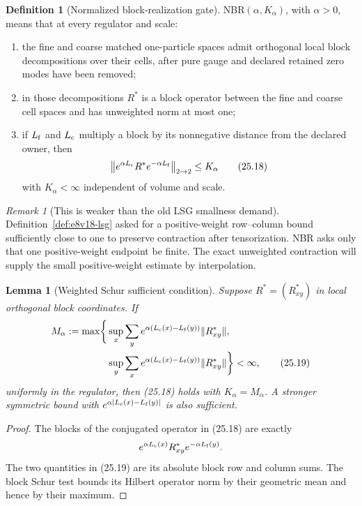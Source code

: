 \documentclass[11pt,oneside]{book}
\newtheorem{lemma}[theorem]{Lemma}
\theoremstyle{definition}
\newtheorem{definition}[theorem]{Definition}
\theoremstyle{remark}
\newtheorem{remark}[theorem]{Remark}
\begin{document}
\begin{definition}[Normalized block-realization gate]
\label{def:e8v25-NBR}
NBR\((\alpha,K_\alpha)\), with \(\alpha>0\), means that at every
regulator and scale:
\begin{enumerate}
\item the fine and coarse matched one-particle spaces admit orthogonal
local block decompositions over their cells, after pure gauge and
declared retained zero modes have been removed;
\item in those decompositions \(R^*\) is a block operator between the
fine and coarse cell spaces and has unweighted norm at most one;
\item if \(L_{\rm f}\) and \(L_{\rm c}\) multiply a block by its
nonnegative distance from the declared owner, then
\[
 \left\|
 e^{\alpha L_{\rm c}}R^*e^{-\alpha L_{\rm f}}
 \right\|_{2\to2}\leq K_\alpha                                  \tag{25.18}
\]
with \(K_\alpha<\infty\) independent of volume and scale.
\end{enumerate}
\end{definition}

\begin{remark}[This is weaker than the old LSG smallness demand]
\label{rem:e8v25-weaker}
Definition~\ref{def:e8v18-lsg} asked for a positive-weight
row--column bound sufficiently close to one to preserve contraction
after tensorization.  NBR asks only that one positive-weight endpoint
be finite.  The exact unweighted contraction will supply the small
positive-weight estimate by interpolation.
\end{remark}

\begin{lemma}[Weighted Schur sufficient condition]
\label{lem:e8v25-Schur}
Suppose \(R^*=(R^*_{xy})\) in local orthogonal block coordinates.
If
\[
\begin{split}
 M_\alpha:=\max\biggl\{&
 \sup_x\sum_y
 e^{\alpha(L_{\rm c}(x)-L_{\rm f}(y))}
       \|R^*_{xy}\|,\\
 &\sup_y\sum_x
 e^{\alpha(L_{\rm c}(x)-L_{\rm f}(y))}
       \|R^*_{xy}\|\biggr\}<\infty,                               \tag{25.19}
\end{split}
\]
uniformly in the regulator, then (25.18) holds with
\(K_\alpha=M_\alpha\).  A stronger symmetric bound with
\(e^{\alpha|L_{\rm c}(x)-L_{\rm f}(y)|}\) is also sufficient.
\end{lemma}

\begin{proof}
The blocks of the conjugated operator in (25.18) are exactly
\[
 e^{\alpha L_{\rm c}(x)}R^*_{xy}e^{-\alpha L_{\rm f}(y)}.
\]
The two quantities in (25.19) are its absolute block row and column
sums.  The block Schur test bounds its Hilbert operator norm by their
geometric mean and hence by their maximum.
\end{proof}
\end{document}
